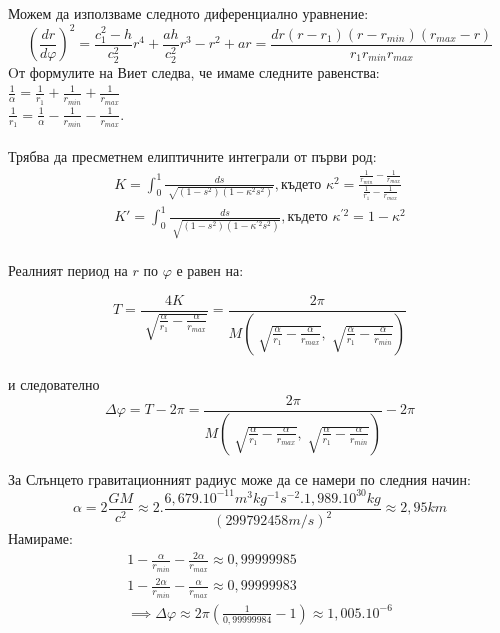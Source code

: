 \documentclass[a4paper,12pt]{article}
\begin{document}
    Можем да използваме следното диференциално уравнение: 
    \begin{equation*}
        \left( \frac{dr}{d\varphi} \right)^2 = \frac{c^2_1-h}{c^2_2}r^4 + \frac{ah}{c^2_2}r^3 - r^2+ar = \frac{dr(r-r_1)(r-r_{min})(r_{max}-r)}{r_1r_{min}r_{max}}
    \end{equation*}
    Oт формулите на Виет следва, че имаме следните равенства: \\
    $\frac{1}{\alpha} = \frac{1}{r_1} + \frac{1}{r_{min}} + \frac{1}{r_{max}}$ \\
    $\frac{1}{r_1} = \frac{1}{\alpha} - \frac{1}{r_{min}} - \frac{1}{r_{max}}$. \\
    \\
    Трябва да пресметнем елиптичните интеграли от първи род: 
    \begin{equation*}
        \begin{aligned}
            K = \int_{0}^{1} \frac{ds}{\sqrt[]{(1-s^2)(1-\kappa^2s^2)}}, \text{където } \kappa^2 = \frac{\frac{1}{r_{min}} - \frac{1}{r_{max}}}{\frac{1}{r_1} - \frac{1}{r_{max}}} \\
            K' = \int_{0}^{1} \frac{ds}{\sqrt[]{(1-s^2)(1-\kappa^{'2}s^2)}}, \text{където }\kappa^{'2} = 1-\kappa^2 \\
    \end{aligned}
    \end{equation*}

    Реалният период на $r$ по $\varphi$ е равен на:

    \begin{equation*}
        T = \frac{4K}{\sqrt[]{\frac{\alpha}{r_1} - \frac{\alpha}{r_{max}}}} = \frac{2\pi}{M\left(\sqrt[]{\frac{\alpha}{r_1} - \frac{\alpha}{r_{max}}}, \sqrt[]{\frac{\alpha}{r_1} - \frac{\alpha}{r_{min}}}\right)}
    \end{equation*} \\
    и следователно \\
    \begin{equation*}
        \varDelta\varphi = T- 2\pi = \frac{2\pi}{M\left(\sqrt[]{\frac{\alpha}{r_1} - \frac{\alpha}{r_{max}}}, \sqrt[]{\frac{\alpha}{r_1} - \frac{\alpha}{r_{min}}}\right)} - 2\pi
    \end{equation*}

    За Слънцето гравитационният радиус може да се намери по следния начин:
    \begin{equation*}
        \alpha = 2\frac{GM}{c^2} \approx 2. \frac{6,679.10^{-11}m^3kg^{-1}s^{-2} . 1,989.10^{30}kg}{(299 792 458m/s)^2} \approx 2, 95km
    \end{equation*}
Намираме: \\
    \begin{equation*}
        \begin{aligned}
            1 - \frac{\alpha}{r_{min}} - \frac{2\alpha}{r_{max}} \approx 0, 99999985 \\
            1 - \frac{2\alpha}{r_{min}} - \frac{\alpha}{r_{max}} \approx 0,99999983 \\
            \implies \varDelta\varphi \approx 2\pi \left( \frac{1}{0,99999984} - 1 \right) \approx 1, 005.10^{-6}
        \end{aligned}
    \end{equation*}
\end{document}
